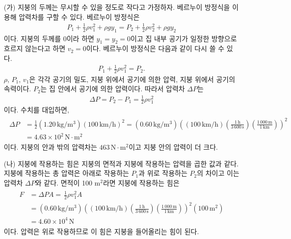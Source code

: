 \documentclass[floatfix,nofootinbib,superscriptaddress,fleqn]{revtex4-2}
\begin{document}
 \begin{itemize}
  \item[(가)] 
  지붕의 두께는 무시할 수 있을 정도로 작다고 가정하자.
  베르누이 방정식을 이용해 압력차를 구할 수 있다. 베르누이 방정식은
  \begin{align}
    P_1+\frac{1}{2}\rho v_1^2 +\rho gy_1
    =P_2+\frac{1}{2}\rho v_2^2 +\rho gy_2 
  \end{align}
  이다. 지붕의 두께를 $0$이라 하면 $y_1=y_2=0$이고 집 내부 공기가 
  일정한 방향으로 흐르지 않는다고 하면 $v_2=0$이다. 베르누이 방정식은
  다음과 같이 다시 쓸 수 있다.
  \begin{align}
    P_1+\frac{1}{2}\rho v_1^2
    =P_2.
  \end{align}
  $\rho$, $P_1$, $v_1$은 각각 공기의 밀도, 지붕 위에서 공기에 의한 압력,
  지붕 위에서 공기의 속력이다. $P_2$는 집 안에서 공기에 의한 압력이다. 따라서
  압력차 $\Delta P$는
  \begin{align}
    \Delta P = P_2 - P_1 = \frac{1}{2}\rho v_1^2
  \end{align}
  이다. 수치를 대입하면,
  \begin{align}
    \begin{split}
      \Delta P &= \frac{1}{2}(1.20\,\mathrm{kg/m^3}) (100\,\mathrm{km/h})^2
      = (0.60\,\mathrm{kg/m^3})
      \left(
        (100\,\mathrm{km/h})
        \left(\frac{1\,\mathrm{h}}{3\,600\,\mathrm{s}}\right) 
        \left(\frac{1\,000\,\mathrm{m}}{1\,\mathrm{km}}\right)
        \right)^2 \\
        &= 4.63\times 10^2\,\mathrm{N\cdot m^2}
      \end{split}
  \end{align}
  이다. 지붕의 안과 밖의 압력차는 $463\,\mathrm{N\cdot m^2}$이고 지붕 안의 압력이
  더 크다.
  \item[(나)] 
  지붕에 작용하는 힘은 지붕의 면적과 지붕에 작용하는 압력을 곱한 값과 같다. 
  지붕에 작용하는 총 압력은 아래로 작용하는 $P_1$과 위로 작용하는 $P_2$의 차이고
  이는 압력차 $\Delta P$와 같다.
  면적이 100 $\mathrm{m^2}$라면 지붕에 작용하는 힘은
  \begin{align}
    \begin{split}
      F &= \Delta P A = \frac{}{} \frac{1}{2}\rho v_1^2 A \\
      &= (0.60\,\mathrm{kg/m^3})
      \left(
        (100\,\mathrm{km/h})
        \left(\frac{1\,\mathrm{h}}{3\,600\,\mathrm{s}}\right) 
        \left(\frac{1\,000\,\mathrm{m}}{1\,\mathrm{km}}\right)
        \right)^2(100\,\mathrm{m^2})  \\
        &= 4.60\times 10^4\,\mathrm{N}
    \end{split}
  \end{align}
  이다. 압력은 위로 작용하므로 이 힘은 지붕을 들어올리는 힘이 된다.
 \end{itemize}
\end{document}
